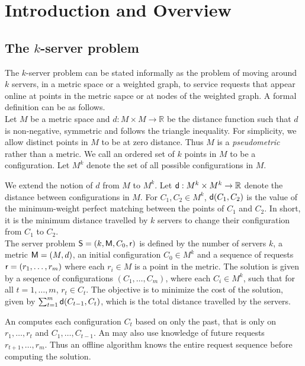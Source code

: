 \chapter{Introduction and Overview}\label{ch:introduction}

\section{The $k$-server problem}\label{sec:k-server-problem}

The $k$-server problem can be stated informally as the problem of moving around $k$ servers, in a metric space or a weighted graph, to service requests that appear online at points in the metric sapce or at nodes of the weighted graph. A formal definition can be as follows. \\

Let $M$ be a metric space and $d: M\times M \rightarrow \mathbb{R}$ be the distance function such that $d$ is non-negative, symmetric and follows the triangle inequality. For simplicity, we allow distinct points in $M$ to be at zero distance. Thus $M$ is a \emph{pseudometric} rather than a metric. We call an ordered set of $k$ points in $M$ to be a configuration. Let $M^k$ denote the set of all possible configurations in $M$. 

We extend the notion of $d$ from $M$ to $M^k$. Let $\dist : M^k\times M^k\rightarrow\mathbb{R}$ denote the distance between configurations in $M$. For $C_1, C_2 \in M^k$, $\dist(C_1, C_2)$ is the value of the minimum-weight perfect matching between the points of $C_1$ and $C_2$. In short, it is the minimum distance travelled by $k$ servers to change their configuration from $C_1$ to $C_2$.\\

The server problem $\sf{S} = (k,\sf{M}, C_0, \sf{r})$ is defined by the number of servers $k$, a metric $\sf{M}=(M,d)$, an initial configuration $C_0\in M^k$ and a sequence of requests $\sf{r}=(r_1, \hdots ,r_m)$ where each $r_i\in M$ is a point in the metric. 
The solution is given by a seqence of configurations $(C_1,\hdots,C_m)$, where each $C_i\in M^k$, such that for all $t = 1,\hdots,m$, $r_t\in C_t$. The objective is to minimize the cost of the solution, given by $\sum_{t=1}^m \sf{d}(C_{t-1}, C_t)$, which is the total distance travelled by the servers.

An  computes each configuration $C_t$ based on only the past, that is only on $r_1,\hdots,r_t$ and $C_1,\hdots,C_{t-1}$. An  may also use knowledge of future requests $r_{t+1},\hdots,r_m$. Thus an offline algorithm knows the entire request sequence before computing the solution.

